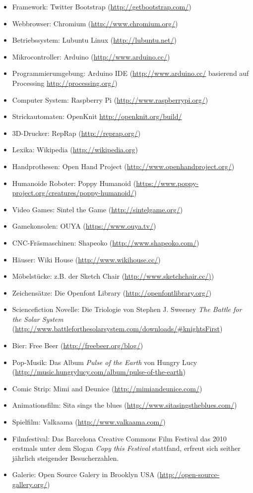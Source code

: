 \documentclass[
paper=164mm:234mm, %
pagesize, %
DIV=calc, %
10pt, %
parskip=half- %
]{scrbook}
\begin{document}
\begin{itemize}
	\item Framework: Twitter Bootstrap (\url{http://getbootstrap.com/})
	\item Webbrowser: Chromium (\url{http://www.chromium.org/})
	\item Betriebssystem: Lubuntu Linux (\url{http://lubuntu.net/})
	\item Mikrocontroller: Arduino (\url{http://www.arduino.cc/})
	\item Programmierumgebung: Arduino IDE (\url{http://www.arduino.cc/} basierend auf Processing \url{http://processing.org/})
	\item Computer System: Raspberry Pi (\url{http://www.raspberrypi.org/})
	\item Strickautomaten: OpenKnit \url{http://openknit.org/build/}
	\item 3D-Drucker: RepRap (\url{http://reprap.org/})
	\item Lexika: Wikipedia (\url{http://wikipedia.org})
	\item Handprothesen: Open Hand Project (\url{http://www.openhandproject.org/})
	\item Humanoide Roboter: Poppy Humanoid (\url{https://www.poppy-project.org/creatures/poppy-humanoid/})
	\item Video Games: Sintel the Game (\url{http://sintelgame.org/})
	\item Gamekonsolen: OUYA (\url{https://www.ouya.tv/})
	\item CNC-Fräsmaschinen: Shapeoko (\url{http://www.shapeoko.com/})
	\item Häuser: Wiki House (\url{http://www.wikihouse.cc/})
	\item Möbelstücke: z.B. der Sketch Chair (\url{http://www.sketchchair.cc/)})
	\item Zeichensätze: Die Openfont Library  (\url{http://openfontlibrary.org/})
	\item Sciencefiction Novelle: Die Triologie von Stephen J. Sweeney \emph{The Battle for the Solar System} (\url{http://www.battleforthesolarsystem.com/downloads/#knightsFirst})
	\item Bier: Free Beer (\url{http://freebeer.org/blog/})
	\item Pop-Musik: Das Album \emph{Pulse of the Earth} von Hungry Lucy (\url{http://music.hungrylucy.com/album/pulse-of-the-earth})
	\item Comic Strip: Mimi and Deunice (\url{http://mimiandeunice.com/})
	\item Animationsfilm: Sita sings the blues (\url{http://www.sitasingstheblues.com/})
	\item Spielfilm: Valkaama (\url{http://www.valkaama.com/})
	\item Filmfestival: Das Barcelona Creative Commons Film Festival das 2010 erstmals unter dem Slogan \emph{Copy this Festival} stattfand, erfreut sich seither jährlich steigender Besucherzahlen.
	\item Galerie: Open Source Galery in Brooklyn USA (\url{http://open-source-gallery.org/})
\end{itemize}
\end{document}
